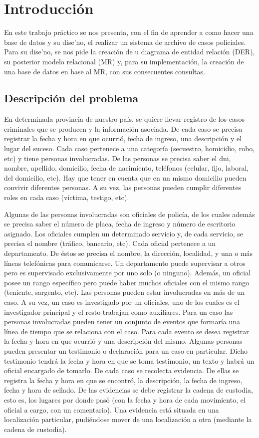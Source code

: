 \section{Introducción}
\noindent En este trabajo pr\'actico se nos presenta, con el fin de aprender a como hacer una base de datos y su dise'no, el realizar un sistema de archivo de casos policiales. Para su dise'no, se nos pide la creaci\'on de u diagrama de entidad relaci\'on (DER), su posterior modelo relacional (MR) y, para su implementaci\'on, la creaci\'on de una base de datos en base al MR, con sus consecuentes consultas.

\subsection{Descripción del problema}
\par En determinada provincia de nuestro país, se quiere llevar registro de los casos criminales que se producen y la información asociada. De cada caso se precisa registrar la fecha y hora en que ocurrió, fecha de ingreso, una descripción y el lugar del suceso. Cada caso pertenece a una categoría (secuestro, homicidio, robo, etc) y tiene personas involucradas. De las personas se precisa saber el dni, nombre, apellido, domicilio, fecha de nacimiento, teléfonos (celular, fijo, laboral, del domicilio, etc). Hay que tener en cuenta que en un mismo domicilio pueden convivir diferentes personas. A su vez, las personas pueden cumplir diferentes roles en cada caso (víctima, testigo, etc).
\par Algunas de las personas involucradas son oficiales de policía, de los cuales además se precisa saber el número de placa, fecha de ingreso y número de escritorio asignado. Los oficiales cumplen un determinado servicio y, de cada servicio, se precisa el nombre (tráfico, bancario, etc). Cada oficial pertenece a un departamento. De éstos se precisa el nombre, la dirección, localidad, y una o más líneas telefónicas para comunicarse. Un departamento puede supervisar a otros pero es supervisado exclusivamente por uno solo (o ninguno). Además, un oficial posee un rango específico pero puede haber muchos oficiales con el mismo rango (teniente, sargento, etc). Las personas pueden estar involucradas en más de un caso. A su vez, un caso es investigado por un oficiales, uno de los cuales es el investigador principal y el resto trabajan como auxiliares. Para un caso las personas involucradas pueden tener un conjunto de eventos que formaría una línea de tiempo que se relaciona con el caso. Para cada evento se desea registrar la fecha y hora en que ocurrió y una descripción del mismo. Algunas personas pueden presentar un testimonio o declaración para un caso en particular. Dicho testimonio tendrá la fecha y hora en que se toma testimonio, un texto y habrá un oficial encargado de tomarlo. De cada caso se recolecta evidencia. De ellas se registra la fecha y hora en que se encontró, la descripción, la fecha de ingreso, fecha y hora de sellado. De las evidencias se debe registrar la cadena de custodia, esto es, los lugares por donde pasó (con la fecha y hora de cada movimiento, el oficial a cargo, con un comentario). Una evidencia está situada en una localización particular, pudiéndose mover de una localización a otra (mediante la cadena de custodia).
